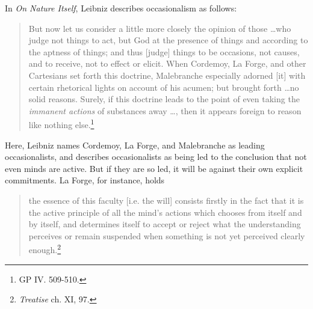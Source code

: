 \documentclass[]{article}
\begin{document}
In \emph{On Nature Itself}, Leibniz describes occasionalism as follows:

\begin{quote}
	But now let us consider a little more closely the opinion of those \ldots who judge not things to act, but God at the presence of things and according to the aptness of things; and thus [judge] things to be occasions, not causes, and to receive, not to effect or elicit. When Cordemoy, La Forge, and other Cartesians set forth this doctrine, Malebranche especially adorned {[}it{]} with certain rhetorical lights on account of his acumen; but brought forth \ldots no solid reasons. Surely, if this doctrine leads to the point of even taking the \emph{immanent actions} of substances away \ldots, then it appears foreign to reason like nothing else.\footnote{GP IV. 509-510.}
\end{quote}

Here, Leibniz names Cordemoy, La Forge, and Malebranche as leading occasionalists, and describes occasionalists as being led to the conclusion that not even minds are active. But if they are so led, it will be against their own explicit commitments. La Forge, for instance, holds

\begin{quote}
	the essence of this faculty {[}i.e. the will{]} consists firstly in the fact that it is the active principle of all the mind's actions which chooses from itself and by itself, and determines itself to accept or reject what the understanding perceives or remain suspended when something is not yet perceived clearly enough.\footnote{\emph{Treatise} ch. XI, 97.}
\end{quote}
\end{document}
